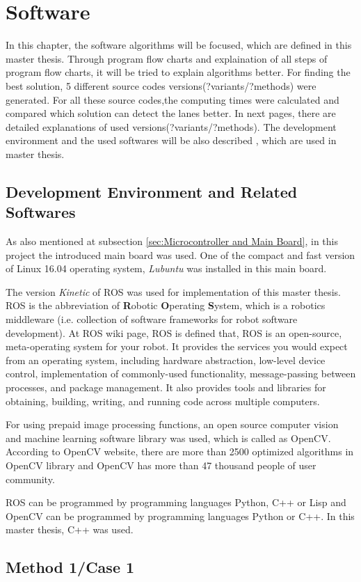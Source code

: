 %
\section{Software}\label{sec:Software}


In this chapter, the software algorithms will be focused, which are defined in this master thesis.  Through program flow charts and explaination of all steps of program flow charts, it will be tried to explain algorithms better. For finding the best solution, 5 different source codes versions(?variants/?methods) were generated. For all these source codes,the computing times were calculated and compared which solution can detect the lanes better. In next pages, there are detailed explanations of used versions(?variants/?methods). The development environment and the used softwares will be also described , which are used in master thesis.

\subsection{Development Environment and Related Softwares}
\label{sec:Development Environment and Related Softwares}

As also mentioned at subsection \ref{sec:Microcontroller and Main Board}, in this project the introduced main board was used. One of the compact and fast version of Linux 16.04 operating system, \textit{Lubuntu} was installed in this main board.

The version \textit{Kinetic} of ROS was used for implementation of this master thesis. ROS is the abbreviation of \textbf{R}obotic \textbf{O}perating \textbf{S}ystem, which is a robotics middleware (i.e. collection of software frameworks for robot software development). At ROS wiki page\cite{ROS}, ROS is defined that, ROS is an open-source, meta-operating system for your robot. It provides the services you would expect from an operating system, including hardware abstraction, low-level device control, implementation of commonly-used functionality, message-passing between processes, and package management. It also provides tools and libraries for obtaining, building, writing, and running code across multiple computers.

For using prepaid image processing functions, an open source computer vision and machine learning software library was used, which is called as OpenCV. According to OpenCV website\cite{OpenCV}, there are more than 2500 optimized algorithms in OpenCV library and OpenCV has more than 47 thousand people of user community.

ROS can be programmed by programming languages Python, C++ or Lisp and OpenCV can be programmed by programming languages Python or C++. In this master thesis, C++ was used.

\subsection{Method 1/Case 1}\label{sec:Method 1}




 
%


